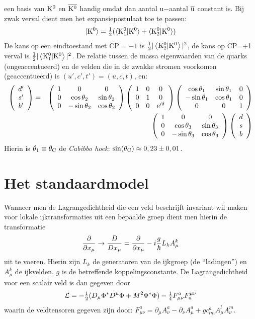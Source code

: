 een basis van $\rm K^0$ en $\rm\overline{K^0}$ handig omdat dan
aantal u$-$aantal$~\overline{\rm u}$ constant is. Bij zwak verval dient men het
expansiepostulaat toe te passen:
\[
\rm|K^0\rangle=\mbox{$\frac{1}{2}$}(\langle K_1^0|K^0\rangle+\langle K_2^0|K^0\rangle)
\]
De kans op een eindtoestand met CP$=-1$ is $\rm\mbox{$\frac{1}{2}$}|\left\langle K_2^0|K^0 \right\rangle|^2$, de
kans op CP=+1 verval is $\rm\mbox{$\frac{1}{2}$}|\left\langle K_1^0|K^0 \right\rangle|^2$.
\npar
De relatie tussen de massa eigenwaarden van de quarks (ongeaccentueerd) en de
velden die in de zwakke stromen voorkomen (geaccentueerd) is
$(u',c',t')=(u,c,t)$, en:
\begin{eqnarray*}
\left(\begin{array}{c}d'\\s'\\b'\end{array}\right)&=&
\left(\begin{array}{ccc}
1&0&0\\
0&\cos\theta_2&\sin\theta_2\\
0&-\sin\theta_2&\cos\theta_2
\end{array}\right)
\left(\begin{array}{ccc}
1&0&0\\
0&1&0\\
0&0&{\rm e}^{i\delta}
\end{array}\right)
\left(\begin{array}{ccc}
\cos\theta_1&\sin\theta_1&0\\
-\sin\theta_1&\cos\theta_1&0\\
0&0&1\\
\end{array}\right)\\
&&\left(\begin{array}{ccc}
1&0&0\\
0&\cos\theta_3&\sin\theta_3\\
0&-\sin\theta_3&\cos\theta_3\\
\end{array}\right)
\left(\begin{array}{c}d\\s\\b\end{array}\right)
\end{eqnarray*}
Hierin is $\theta_1\equiv\theta_{\rm C}$ de {\it Cabibbo hoek}:
$\sin(\theta_{\rm C})\approx0,23\pm0,01$.

\section[~~Het standaardmodel]{Het standaardmodel}
Wanneer men de Lagrangedichtheid die een veld beschrijft invariant wil maken
voor lokale ijktransformaties uit een bepaalde groep dient men hierin de
transformatie
\[
\frac{\partial }{\partial x_\mu}\rightarrow\frac{D}{Dx_\mu}=\frac{\partial }{\partial x_\mu}-i\frac{g}{\hbar}L_kA_\mu^k
\]
uit te voeren. Hierin zijn $L_k$ de generatoren van de ijkgroep (de ``ladingen'')
en $A_\mu^k$ de ijkvelden. $g$ is de betreffende koppelingsconstante. De
Lagrangedichtheid voor een scalair veld is dan gegeven door
\[
{\cal L}=-\mbox{$\frac{1}{2}$}(D_\mu\Phi^*D^\mu\Phi+M^2\Phi^*\Phi)-\mbox{$\frac{1}{4}$} F_{\mu\nu}^aF_a^{\mu\nu}
\]
waarin de veldtensoren gegeven zijn door:
$F^a_{\mu\nu}=\partial_\mu A^a_\nu-\partial_\nu A^a_\mu+gc^a_{lm}A_\mu^lA_\nu^m$.


